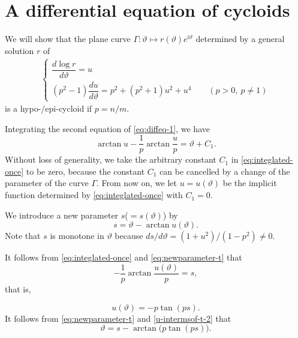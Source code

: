 \documentclass[a4paper]{amsart}
\theoremstyle{plain}
\theoremstyle{remark}
\numberwithin{equation}{section}
\begin{document}
\section{A differential equation of cycloids}\label{B}
We will show that the plane curve 
$\varGamma \colon \vartheta \mapsto r(\vartheta)e^{{\mathrm{i}} \vartheta}$ 
determined by a general solution $r$ of 
\begin{align}\label{eq:diffeq-1}
\begin{cases}
  \dfrac{d \log r}{d \vartheta} = u  \\[6pt]
 (p^2-1)\dfrac{du}{d \vartheta}= p^2+ (p^2 + 1)u^2+u^4 \qquad (p>0,~ p\ne 1)
\end{cases}
\end{align}
is a hypo-/epi-cycloid  if $p=n/m$.  

Integrating the second equation of \eqref{eq:diffeq-1}, 
 we have 
\begin{equation}\label{eq:integlated-once}
 \arctan u - \frac{1}{p} \arctan \frac{u}{p}
= \vartheta + C_1.
\end{equation}
Without loss of generality, we take   
the arbitrary constant $C_1$ in \eqref{eq:integlated-once} to be zero, 
because the constant $C_1$ can be cancelled by 
a change of the parameter of the curve $\varGamma$. 
From now on, we let $u=u(\vartheta)$ be the implicit function 
determined by \eqref{eq:integlated-once} with $C_1=0$. 

We introduce a new parameter
$s$($=s(\vartheta)$) by
\begin{equation}\label{eq:newparameter-t}
 s=\vartheta - \arctan u(\vartheta). 
\end{equation} 
Note that $s$ is monotone in $\vartheta$ because  
$ds/d \vartheta = (1+u^2)/(1-p^2) \ne 0$. 

It follows from \eqref{eq:integlated-once} and 
\eqref{eq:newparameter-t} that 
\begin{equation}\label{u-intermsof-t}
 -\frac{1}{p} \arctan \frac{u(\vartheta)}{p} = s, 
\end{equation}
that is, 
\begingroup
\addtocounter{equation}{-1}

\begin{equation}\label{u-intermsof-t-2}
 u(\vartheta)=-p  \tan (p s). 
\end{equation}
\endgroup
It follows from \eqref{eq:newparameter-t} and 
\eqref{u-intermsof-t-2} that 
\begin{equation}\label{eq:t-theta}
 \vartheta = s - \arctan\bigl(p \tan (ps)\bigr).
\end{equation}
\end{document}
